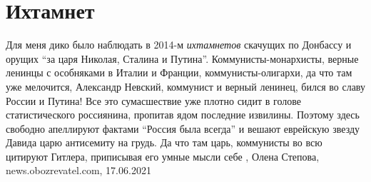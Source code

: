  
 
 
 
 
\chapter{Ихтамнет}

Для меня дико было наблюдать в 2014-м \emph{ихтамнетов} скачущих по Донбассу и
орущих \enquote{за царя Николая, Сталина и Путина}. Коммунисты-монархисты,
верные ленинцы с особняками в Италии и Франции, коммунисты-олигархи, да что там
уже мелочится, Александр Невский, коммунист и верный ленинец, бился во славу
России и Путина!  Все это сумасшествие уже плотно сидит в голове
статистического россиянина, пропитав ядом последние извилины. Поэтому здесь
свободно апеллируют фактами \enquote{Россия была всегда} и вешают еврейскую
звезду Давида царю антисемиту на грудь.  Да что там царь, коммунисты во всю
цитируют Гитлера, приписывая его умные мысли себе
, 
Олена Степова, news.obozrevatel.com, 17.06.2021

